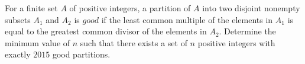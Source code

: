For a finite set $A$ of positive integers, a partition of $A$ into two disjoint nonempty subsets $A_1$ and $A_2$ is $\textit{good}$ if the least common multiple of the elements in $A_1$ is equal to the greatest common divisor of the elements in $A_2$.
Determine the minimum value of $n$ such that there exists a set of $n$ positive integers with exactly $2015$ good partitions.

